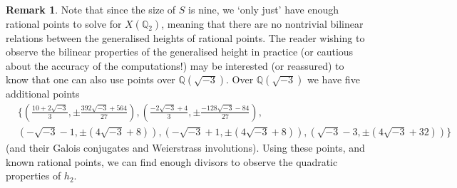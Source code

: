 \documentclass[11pt]{amsart}
\def\Q{\mathbb Q}
\theoremstyle{plain}
\theoremstyle{definition}
\newtheorem{remark}{Remark}
\DeclareMathOperator{\Gal}{Gal}
\newcommand{\dR}{\mathrm{dR}}
\newcommand{\Div}{\mathrm{Div}}
\newcommand{\Sym}{\mathrm{Sym}}
\newcommand{\Jac}{\mathrm{Jac}}
\newcommand{\Res}{\mathrm{Res}}
\newcommand{\Ker}{\mathrm{Ker}}
\begin{document}
%

\begin{remark}
Note that since the size of $S$ is nine, we `only just' have enough rational points to solve for $X(\Q _2 )$, meaning that there are no nontrivial bilinear relations between the generalised heights of rational points. The reader wishing to observe the bilinear properties of the generalised height in practice (or cautious about the accuracy of the computations!) may be interested (or reassured) to know that one can also use points over $\Q (\sqrt{-3})$. Over $\Q (\sqrt{-3})$ we have five additional points
\begin{align*}
& \{(\frac{10+2\sqrt{-3}}{3},\pm \frac{392\sqrt{-3} + 564}{27}), (\frac{-2\sqrt{-3} + 4}{3} ,\pm \frac{-128\sqrt{-3} - 84}{27}), \\
 & (-\sqrt{-3} - 1,\pm (4\sqrt{-3} + 8)),(-\sqrt{-3} + 1,\pm (4\sqrt{-3} + 8)),  (\sqrt{-3} - 3,\pm (4\sqrt{-3} + 32))\}
\end{align*}
(and their Galois conjugates and Weierstrass involutions). Using these points, and known rational points, we can find enough divisors to observe the quadratic properties of $h_2 $.
\end{remark}
\end{document}
